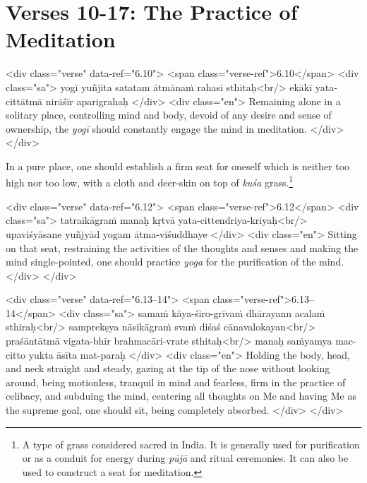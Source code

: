 \section{Verses 10-17: The Practice of Meditation}\label{sec-verses-10-17-the-practice-of-meditation}

\begin{html}
<div class="verse" data-ref="6.10">
  <span class="verse-ref">6.10</span>
  <div class="sa">
    yogī yuñjīta satatam ātmānaṁ rahasi sthitaḥ<br/>
    ekākī yata-cittātmā nirāśīr aparigrahaḥ
  </div>
  <div class="en">
    Remaining alone in a solitary place, controlling mind and body, devoid of any desire and sense of ownership, the \textit{yogī} should constantly engage the mind in meditation.
  </div>
</div>
\end{html}


{In a pure place, one should establish a firm seat for oneself which is neither too high nor too low, with a cloth and deer-skin on top of \textit{kuśa} grass.\footnote{A type of grass considered sacred in India. It is generally used for purification or as a conduit for energy during \textit{pūjā} and ritual ceremonies. It can also be used to construct a seat for meditation.}}


\begin{html}
<div class="verse" data-ref="6.12">
  <span class="verse-ref">6.12</span>
  <div class="sa">
    tatraikāgraṁ manaḥ kṛtvā yata-cittendriya-kriyaḥ<br/>
    upaviśyāsane yuñjyād yogam ātma-viśuddhaye
  </div>
  <div class="en">
    Sitting on that seat, restraining the activities of the thoughts and senses and making the mind single-pointed, one should practice \textit{yoga} for the purification of the mind.
  </div>
</div>
\end{html}



\begin{html}
<div class="verse" data-ref="6.13–14">
  <span class="verse-ref">6.13–14</span>
  <div class="sa">
    samaṁ kāya-śiro-grīvaṁ dhārayann acalaṁ sthiraḥ<br/>
    samprekṣya nāsikāgraṁ svaṁ diśaś cānavalokayan<br/>
    praśāntātmā vigata-bhīr brahmacāri-vrate sthitaḥ<br/>
    manaḥ saṁyamya mac-citto yukta āsīta mat-paraḥ
  </div>
  <div class="en">
    Holding the body, head, and neck straight and steady, gazing at the tip of the nose without looking around, being motionless, tranquil in mind and fearless, firm in the practice of celibacy, and subduing the mind, centering all thoughts on Me and having Me as the supreme goal, one should sit, being completely absorbed.
  </div>
</div>
\end{html}



